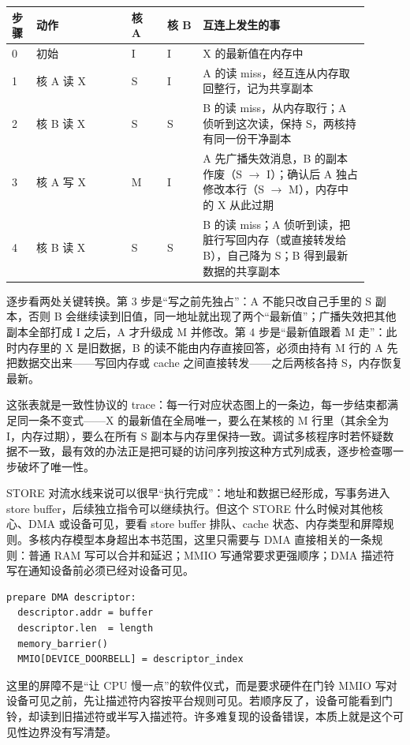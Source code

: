 \begin{longtable}{L{0.06\linewidth}L{0.24\linewidth}L{0.09\linewidth}L{0.09\linewidth}L{0.42\linewidth}}
\toprule
步骤 & 动作 & 核 A & 核 B & 互连上发生的事 \\
 & 初始 & I & I & X 的最新值在内存中 \\
1 & 核 A 读 X & S & I & A 的读 miss，经互连从内存取回整行，记为共享副本 \\
2 & 核 B 读 X & S & S & B 的读 miss，从内存取行；A 侦听到这次读，保持 S，两核持有同一份干净副本 \\
3 & 核 A 写 X & M & I & A 先广播失效消息，B 的副本作废（S $\rightarrow$ I）；确认后 A 独占修改本行（S $\rightarrow$ M），内存中的 X 从此过期 \\
4 & 核 B 读 X & S & S & B 的读 miss；A 侦听到读，把脏行写回内存（或直接转发给 B），自己降为 S；B 得到最新数据的共享副本 \\
\bottomrule
\end{longtable}

逐步看两处关键转换。第 3 步是“写之前先独占”：A 不能只改自己手里的 S 副本，否则 B 会继续读到旧值，同一地址就出现了两个“最新值”；广播失效把其他副本全部打成 I 之后，A 才升级成 M 并修改。第 4 步是“最新值跟着 M 走”：此时内存里的 X 是旧数据，B 的读不能由内存直接回答，必须由持有 M 行的 A 先把数据交出来——写回内存或 cache 之间直接转发——之后两核各持 S，内存恢复最新。

这张表就是一致性协议的 trace：每一行对应状态图上的一条边，每一步结束都满足同一条不变式——X 的最新值在全局唯一，要么在某核的 M 行里（其余全为 I，内存过期），要么在所有 S 副本与内存里保持一致。调试多核程序时若怀疑数据不一致，最有效的办法正是把可疑的访问序列按这种方式列成表，逐步检查哪一步破坏了唯一性。

STORE 对流水线来说可以很早“执行完成”：地址和数据已经形成，写事务进入 store buffer，后续独立指令可以继续执行。但这个 STORE 什么时候对其他核心、DMA 或设备可见，要看 store buffer 排队、cache 状态、内存类型和屏障规则。多核内存模型本身超出本书范围，这里只需要与 DMA 直接相关的一条规则：普通 RAM 写可以合并和延迟；MMIO 写通常要求更强顺序；DMA 描述符写在通知设备前必须已经对设备可见。

\begin{lstlisting}
prepare DMA descriptor:
  descriptor.addr = buffer
  descriptor.len  = length
  memory_barrier()
  MMIO[DEVICE_DOORBELL] = descriptor_index
\end{lstlisting}

这里的屏障不是“让 CPU 慢一点”的软件仪式，而是要求硬件在门铃 MMIO 写对设备可见之前，先让描述符内容按平台规则可见。若顺序反了，设备可能看到门铃，却读到旧描述符或半写入描述符。许多难复现的设备错误，本质上就是这个可见性边界没有写清楚。

